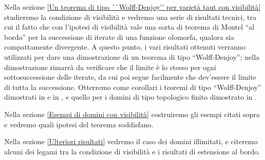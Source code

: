 Nella sezione \ref{Un teorema di tipo ``Wolff-Denjoy'' per varietà taut con visibilità} studieremo la condizione di visibilità e vedremo una serie di risultati tecnici, tra cui il fatto che con l'ipotesi di visibilità vale una sorta di teorema di Montel ``al bordo'' per la successione di iterate di una funzione olomorfa, qualora sia compattamente divergente. A questo punto, i vari risultati ottenuti verranno utilizzati per dare una dimostrazione di un teorema di tipo ``Wolff-Denjoy''; nella dimostrazione rimarrà da verificare che il limite è lo stesso per ogni sottosuccessione delle iterate, da cui poi segue facilmente che dev'essere il limite di tutta la successione. Otterremo come corollari i teoremi di tipo ``Wolff-Denjoy'' dimostrati in \cite{A4} e in \cite{CMS}, e quello per i domini di tipo topologico finito dimostrato in \cite{BM}.

Nella sezione \ref{Esempi di domini con visibilità} costruiremo gli esempi citati sopra e vedremo quali ipotesi del teorema soddisfano.

Nella sezione \ref{Ulteriori risultati} vedremo il caso dei domini illimitati, e citeremo alcuni dei legami tra la condizione di visibilità e i risultati di estensione al bordo.